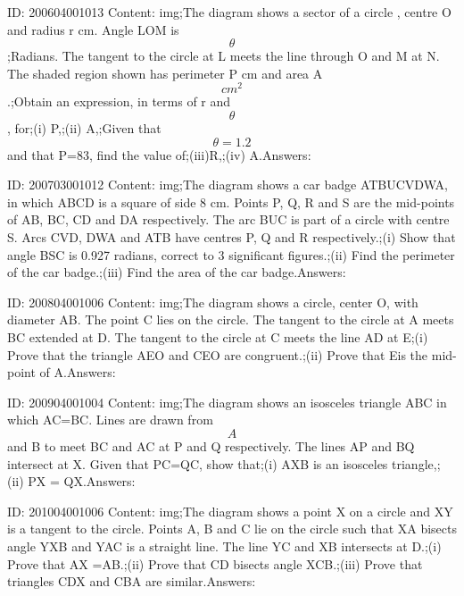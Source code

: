 \documentclass{article}
\begin{document}
ID: 200604001013
Content:
img;The diagram shows a sector of a circle , centre O and radius r cm. Angle LOM is $$\theta$$;Radians. The tangent to the circle at L meets the line through O and M at N. The shaded region shown has perimeter P cm and area A$$cm^2$$.;Obtain an expression, in terms of r and $$\theta$$, for;(i) P,;(ii)	A,;Given that $$\theta=1.2$$ and that P=83, find the value of;(iii)R,;(iv)	A.Answers:

ID: 200703001012
Content:
img;The diagram shows a car badge ATBUCVDWA, in which ABCD is a square of side 8 cm. Points P, Q, R and S are the mid-points of AB, BC, CD and DA respectively. The arc BUC is part of a circle with centre S. Arcs CVD, DWA and ATB have centres P, Q and R respectively.;(i) Show that angle BSC is 0.927 radians, correct to 3 significant figures.;(ii)	 Find the perimeter of the car badge.;(iii) Find the area of the car badge.Answers:

ID: 200804001006
Content:
img;The diagram shows a circle, center O, with diameter AB. The point C lies on the circle. The tangent to the circle at A meets BC extended at D. The tangent to the circle at C meets the line AD at E;(i) Prove that the triangle AEO and CEO are congruent.;(ii) Prove that Eis the mid-point of A.Answers:

ID: 200904001004
Content:
img;The diagram shows an isosceles triangle ABC in which AC=BC. Lines are drawn from $$A$$ and B to meet BC and AC at P and Q respectively. The lines AP and BQ intersect at X. Given that PC=QC, show that;(i) AXB is an isosceles triangle,;(ii) PX = QX.Answers:

ID: 201004001006
Content:
img;The diagram shows a point X on a circle and XY is a tangent to the circle. Points A, B and C lie on the circle such that XA bisects angle YXB and YAC is a straight line. The line YC and XB intersects at D.;(i) Prove that AX =AB.;(ii) Prove that CD bisects angle XCB.;(iii) Prove that triangles CDX and CBA are similar.Answers:
\end{document}

